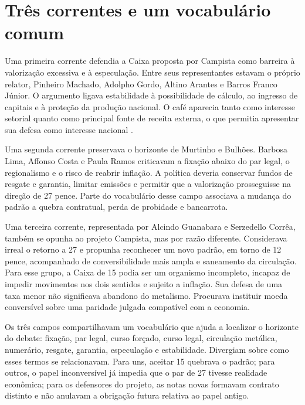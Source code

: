 \section{Três correntes e um vocabulário comum}

Uma primeira corrente defendia a Caixa proposta por Campista como barreira à valorização excessiva e à especulação. Entre seus representantes estavam o próprio relator, Pinheiro Machado, Adolpho Gordo, Altino Arantes e Barros Franco Júnior. O argumento ligava estabilidade à possibilidade de cálculo, ao ingresso de capitais e à proteção da produção nacional. O café aparecia tanto como interesse setorial quanto como principal fonte de receita externa, o que permitia apresentar sua defesa como interesse nacional \cite{torelli2007}.

Uma segunda corrente preservava o horizonte de Murtinho e Bulhões. Barbosa Lima, Affonso Costa e Paula Ramos criticavam a fixação abaixo do par legal, o regionalismo e o risco de reabrir inflação. A política deveria conservar fundos de resgate e garantia, limitar emissões e permitir que a valorização prosseguisse na direção de 27 pence. Parte do vocabulário desse campo associava a mudança do padrão a quebra contratual, perda de probidade e bancarrota.

Uma terceira corrente, representada por Alcindo Guanabara e Serzedello Corrêa, também se opunha ao projeto Campista, mas por razão diferente. Considerava irreal o retorno a 27 e propunha reconhecer um novo padrão, em torno de 12 pence, acompanhado de conversibilidade mais ampla e saneamento da circulação. Para esse grupo, a Caixa de 15 podia ser um organismo incompleto, incapaz de impedir movimentos nos dois sentidos e sujeito a inflação. Sua defesa de uma taxa menor não significava abandono do metalismo. Procurava instituir moeda conversível sobre uma paridade julgada compatível com a economia.


Os três campos compartilhavam um vocabulário que ajuda a localizar o horizonte do debate: fixação, par legal, curso forçado, curso legal, circulação metálica, numerário, resgate, garantia, especulação e estabilidade. Divergiam sobre como esses termos se relacionavam. Para uns, aceitar 15 quebrava o padrão; para outros, o papel inconversível já impedia que o par de 27 tivesse realidade econômica; para os defensores do projeto, as notas novas formavam contrato distinto e não anulavam a obrigação futura relativa ao papel antigo.

